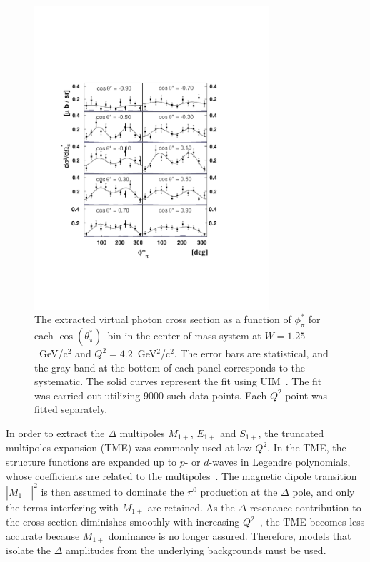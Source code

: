 \documentclass[aps,prl,twocolumn,superscriptaddress]{revtex4}
\begin{document}
\begin{figure}[b]
\includegraphics[width=8.7cm, bb=70 130 480 590]{img/plain_cro_phi_W1.25_Q24.20}
 \caption{The extracted virtual photon cross section as a function of 
          $\phi^*_{\pi}$  for each $\cos(\theta^*_{\pi})$\ bin in
          the center-of-mass system at $W=1.25$~GeV/c$^2$ and 
          $Q^2=4.2$~GeV$^2$/c$^2$. The error bars are statistical, and 
          the gray band at the bottom of each panel corresponds to the 
          systematic. The solid curves represent the fit using 
          UIM~\cite{bib:Inna}. The fit was carried out utilizing 9000 
          such data points. Each $Q^2$ point was fitted separately. }
\label{fig:sig}
\end{figure}

In order to extract the $\Delta$ multipoles $M_{1+}$,  $E_{1+}$
and $S_{1+}$, the truncated multipoles expansion (TME) was commonly 
used at low $Q^2$. In the TME, the structure functions are expanded up 
to $p$- or $d$-waves in Legendre polynomials, whose coefficients are 
related to the multipoles~\cite{bib:raskin}. The magnetic dipole transition 
$|M_{1+}|^2$ is then assumed to dominate the $\pi^0$ production at the 
$\Delta$ pole, and only the terms interfering with $M_{1+}$ are retained.
As the $\Delta$ resonance contribution to the cross section diminishes 
smoothly with increasing  $Q^2$~\cite{bib:Stoler-Phys-Rep}, the TME becomes 
less accurate because $M_{1+}$ dominance is no longer 
assured.  Therefore, models that isolate the $\Delta$ amplitudes from the 
underlying backgrounds must be used.  
\end{document}
